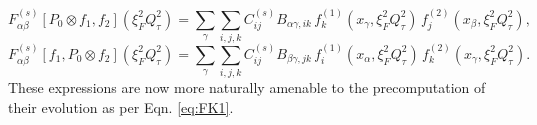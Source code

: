 \documentclass[11pt]{article}
\newcommand{\be}{\begin{equation}}
\newcommand{\ee}{\end{equation}}
\begin{document}
\be \label{eq:deconvsubprocess1} F^{(s)}_{\alpha\beta}[P_0\otimes f_1, f_2](\xi_F^2{Q^2_\tau})=\sum_\gamma \sum_{i,j,k} C^{(s)}_{ij} B_{\alpha\gamma, ik} \, 
 f_k^{(1)}(x_\gamma, \xi_F^2Q_\tau^2)\, f_j^{(2)}(x_{\beta},\xi_F^2Q^2_\tau), \ee
\be \label{eq:deconvsubprocess1} F^{(s)}_{\alpha\beta}[f_1, P_0\otimes f_2](\xi_F^2{Q^2_\tau})=\sum_\gamma \sum_{i,j,k} C^{(s)}_{ij} B_{\beta\gamma, jk} \, 
 f_i^{(1)}(x_\alpha, \xi_F^2Q_\tau^2)\, f_k^{(2)}(x_{\gamma},\xi_F^2Q^2_\tau). \ee
 These expressions are now more naturally amenable to the precomputation of their evolution as per Eqn. \ref{eq:FK1}.
\clearpage
\begin{thebibliography}{1}



\end{thebibliography}
\end{document}
